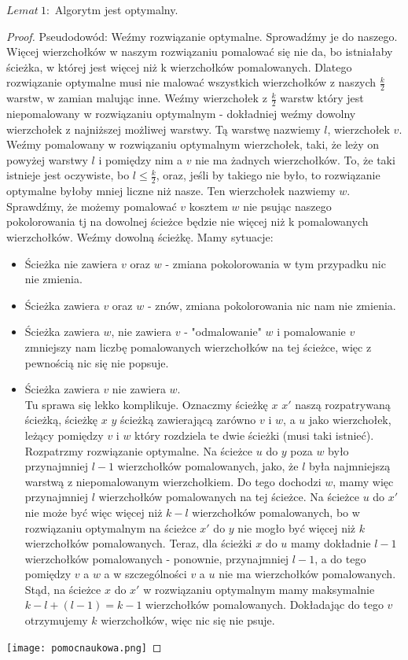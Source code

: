 \documentclass[a4paper]{article}
\begin{document}
$Lemat\ 1:$ Algorytm jest optymalny.
\begin{proof}
Pseudodowód:
Weźmy rozwiązanie optymalne. Sprowadźmy je do naszego. Więcej wierzchołków w naszym rozwiązaniu pomalować się nie da, bo istniałaby ścieżka, w której jest więcej niż k wierzchołków pomalowanych. Dlatego rozwiązanie optymalne musi nie malować wszystkich wierzchołków z naszych $\frac{k}{2}$ warstw, w zamian malując inne. Weźmy wierzchołek z $\frac{k}{2}$ warstw który jest niepomalowany w rozwiązaniu optymalnym - dokładniej weźmy dowolny wierzchołek z najniższej możliwej warstwy. Tą warstwę nazwiemy $l$, wierzchołek $v$. Weźmy pomalowany w rozwiązaniu optymalnym wierzchołek, taki, że leży on powyżej warstwy $l$ i pomiędzy nim a $v$ nie ma żadnych wierzchołków. To, że taki istnieje jest oczywiste, bo $l\leq \frac{k}{2}$, oraz, jeśli by takiego nie było, to rozwiązanie optymalne byłoby mniej liczne niż nasze. Ten wierzchołek nazwiemy $w$. Sprawdźmy, że możemy pomalować $v$ kosztem $w$ nie psując naszego pokolorowania tj na dowolnej ścieżce będzie nie więcej niż k pomalowanych wierzchołków. Weźmy dowolną ścieżkę. Mamy sytuacje:
\begin{itemize}
\item Ścieżka nie zawiera $v$ oraz $w$ - zmiana pokolorowania w tym przypadku nic nie zmienia.
\item Ścieżka zawiera $v$ oraz $w$  - znów, zmiana pokolorowania nic nam nie zmienia.
\item Ścieżka zawiera $w$, nie zawiera $v$ - "odmalowanie" $w$ i pomalowanie $v$ zmniejszy nam liczbę pomalowanych wierzchołków na tej ścieżce, więc z pewnością nic się nie popsuje.
\clearpage
\item Ścieżka zawiera $v$ nie zawiera $w$.\\
Tu sprawa się lekko komplikuje. Oznaczmy ścieżkę $x$ $x'$ naszą rozpatrywaną ścieżką, ścieżkę $x$ $y$ ścieżką zawierającą zarówno $v$ i $w$, a $u$ jako wierzchołek, leżący pomiędzy $v$ i $w$ który rozdziela te dwie ścieżki (musi taki istnieć). Rozpatrzmy rozwiązanie optymalne. Na ścieżce $u$ do $y$ poza $w$ było przynajmniej $l-1$ wierzchołków pomalowanych, jako, że $l$ była najmniejszą warstwą z niepomalowanym wierzchołkiem. Do tego dochodzi $w$, mamy więc przynajmniej $l$ wierzchołków pomalowanych na tej ścieżce. Na ścieżce $u$ do $x'$ nie może być więc więcej niż $k-l$ wierzchołków pomalowanych, bo w rozwiązaniu optymalnym na ścieżce $x'$ do $y$ nie mogło być więcej niż $k$ wierzchołków pomalowanych. Teraz, dla ścieżki $x$ do $u$ mamy dokładnie $l-1$ wierzchołków pomalowanych - ponownie, przynajmniej $l-1$, a do tego pomiędzy $v$ a $w$ a w szczególności $v$ a $u$ nie ma wierzchołków pomalowanych. Stąd, na ścieżce $x$ do $x'$ w rozwiązaniu optymalnym mamy maksymalnie $k-l+(l-1)=k-1$ wierzchołków pomalowanych. Dokładając do tego $v$ otrzymujemy $k$ wierzchołków, więc nic się nie psuje. 
\end{itemize}
\texttt{[image: pomocnaukowa.png]}


\end{proof}
\end{document}
